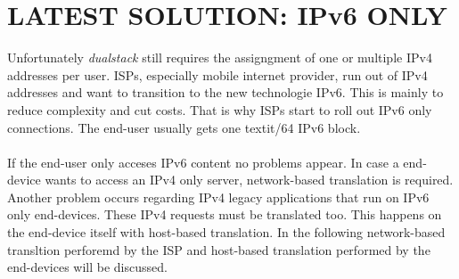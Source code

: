 \documentclass[format=sigconf, natbib=true, nonacm=true]{acmart}
\begin{document}
    \section{LATEST SOLUTION: IPv6 ONLY}
    Unfortunately \textit{dualstack} still requires the assigngment of one or multiple IPv4 addresses per user. ISPs, especially mobile internet provider, run out of IPv4 addresses and want to transition to the new technologie IPv6. This is mainly to reduce complexity and cut costs. That is why ISPs start to roll out IPv6 only connections. The end-user usually gets one textit{/64} IPv6 block.\\\\If the end-user only acceses IPv6 content no problems appear. In case a end-device wants to access an IPv4 only server, network-based translation is required. Another problem occurs regarding IPv4 legacy applications that run on IPv6 only end-devices. These IPv4 requests must be translated too. This happens on the end-device itself with host-based translation. In the following network-based transltion perforemd by the ISP and host-based translation performed by the end-devices will be discussed.
\end{document}
